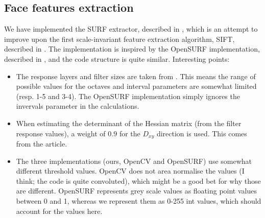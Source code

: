 \subsection{Face features extraction}
We have implemented the SURF extractor, described in \cite{SURF},
which is an attempt to improve upon the first scale-invariant feature
extraction algorithm, SIFT, described in \cite{SIFT}. The
implementation is inspired by the OpenSURF implementation, described
in \cite{OpenSURF}, and the code structure is quite similar.
Interesting points:

\begin{itemize}
\item The response layers and filter sizes are taken from \cite{SURF}.
  This means the range of possible values for the octaves and interval
  parameters are somewhat limited (resp. 1-5 and 3-4). The OpenSURF
  implementation simply ignores the invervals parameter in the
  calculations.
\item When estimating the determinant of the Hessian matrix (from the
  filter response values), a weight of $0.9$ for the $D_{xy}$
  direction is used. This comes from the article.
\item The three implementations (ours, OpenCV and OpenSURF) use
  somewhat different threshold values. OpenCV does not area normalise
  the values (I think; the code is quite convoluted), which might be a
  good bet for why those are different. OpenSURF represents grey scale
  values as floating point values between 0 and 1, whereas we
  represent them as 0-255 int values, which should account for the
  values here.
\end{itemize}
